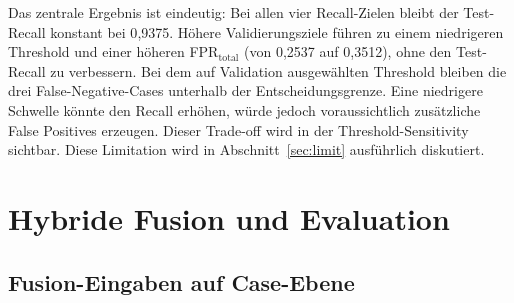 \begin{table}[htb]
  \centering
  \caption{Threshold-Sensitivity der Log-Komponente}
  \label{tab:sensitivity}
\end{table}

Das zentrale Ergebnis ist eindeutig: Bei allen vier Recall-Zielen bleibt der Test-Recall konstant bei 0{,}9375. Höhere Validierungsziele führen zu einem niedrigeren Thresh\-old und einer höheren FPR$_{\text{total}}$ (von 0{,}2537 auf 0{,}3512), ohne den Test-Recall zu verbessern. Bei dem auf Validation ausgewählten Threshold bleiben die drei False-Negative-Cases unterhalb der Entscheidungsgrenze. Eine niedrigere Schwelle könnte den Recall erhöhen, würde jedoch voraussichtlich zusätzliche False Positives erzeugen. Dieser Trade-off wird in der Threshold-Sensitivity sichtbar. Diese Limitation wird in Abschnitt~\ref{sec:limit} ausführlich diskutiert.

\section{Hybride Fusion und Evaluation}

\subsection{Fusion-Eingaben auf Case-Ebene}


